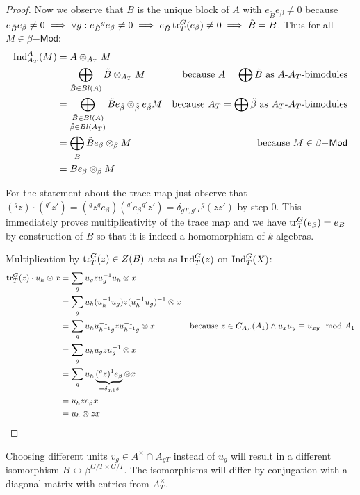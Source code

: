 \begin{proof}
Now we observe that $B$ is the unique block of $A$ with $e_{\tilde{B}} e_\beta \neq 0$ because $e_{\tilde{B}} e_\beta \neq 0 \implies \forall  g: e_{\tilde{B}} {^g e_\beta} \neq 0 \implies e_{\tilde{B}} \operatorname{tr}_T^ G(e_\beta) \neq 0 \implies \tilde{B}=B$. Thus for all $M\in \beta\mathsf{-Mod}$:
\begin{align*}
\operatorname{Ind}_{A_T}^A(M) &= A \otimes_{A_T} M \\
&= \bigoplus_{\tilde{B}\in Bl(A)} \tilde{B}\otimes_{A_T} M &\text{because $A=\bigoplus \tilde{B}$ as $A$-$A_T$-bimodules}\\
&= \bigoplus_{\substack{\tilde{B}\in Bl(A) \\ \tilde{\beta}\in Bl(A_T)}} \tilde{B}e_{\tilde{\beta}}\otimes_{\tilde{\beta}} e_{\tilde{\beta}} M &\text{because $A_T=\bigoplus \tilde{\beta}$ as $A_T$-$A_T$-bimodules}\\
&= \bigoplus_{\tilde{B}} \tilde{B}e_\beta \otimes_\beta M &\text{because }M\in\beta\mathsf{-Mod} \\
&= Be_\beta \otimes_\beta M
\end{align*}

For the statement about the trace map just observe that $(^g z)\cdot (^{g'} z') = ({^g z}{^g e_\beta})({^{g'}e_\beta}{^{g'} z'}) = \delta_{gT,g'T} {^g(zz')}$ by step 0. This immediately proves multiplicativity of the trace map and we have $\operatorname{tr}_T^G(e_\beta)=e_B$ by construction of $B$ so that it is indeed a homomorphism of $k$-algebras.

Multiplication by $\operatorname{tr}_T^G(z) \in Z(B)$ acts as $\operatorname{Ind}_T^G(z)$ on $\operatorname{Ind}_T^G(X)$:
\begin{align*}
\operatorname{tr}_T^G(z) \cdot u_h\otimes x &= \sum_g u_g z u_g^{-1} u_h \otimes x \\
&= \sum_g u_h (u_h^{-1} u_g)z(u_h^{-1} u_g)^{-1}  \otimes x\\
&= \sum_g u_h u_{h^{-1}g}^{-1} z u_{h^{-1} g}^{-1} \otimes x &\text{because }z\in C_{A_T}(A_1) \wedge u_x u_y \equiv u_{xy} \mod A_1 \\
&= \sum_g u_h u_g z u_g^{-1} \otimes x \\
&= \sum_g u_h \underbrace{(^g z){^1 e_\beta}}_{=\delta_{g,1} z} \otimes x \\
&= u_h z e_\beta x \\
&= u_h \otimes zx \qedhere
\end{align*}
\end{proof}

\begin{remark}
Choosing different units $v_g\in A^\times\cap A_{gT}$ instead of $u_g$ will result in a different isomorphism $B \leftrightarrow \beta^{G/T \times G/T}$. The isomorphisms will differ by conjugation with a diagonal matrix with entries from $A_T^\times$.
\end{remark}

